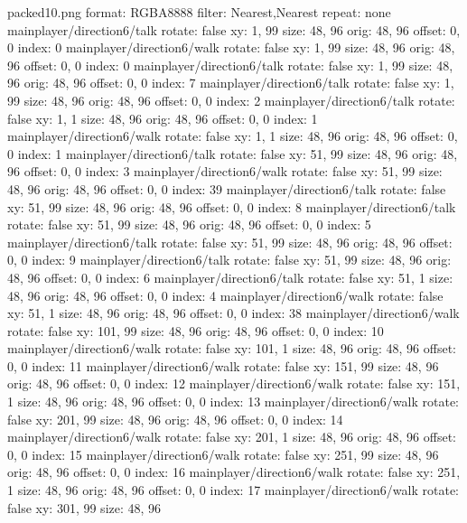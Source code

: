 packed10.png
format: RGBA8888
filter: Nearest,Nearest
repeat: none
mainplayer/direction6/talk
  rotate: false
  xy: 1, 99
  size: 48, 96
  orig: 48, 96
  offset: 0, 0
  index: 0
mainplayer/direction6/walk
  rotate: false
  xy: 1, 99
  size: 48, 96
  orig: 48, 96
  offset: 0, 0
  index: 0
mainplayer/direction6/talk
  rotate: false
  xy: 1, 99
  size: 48, 96
  orig: 48, 96
  offset: 0, 0
  index: 7
mainplayer/direction6/talk
  rotate: false
  xy: 1, 99
  size: 48, 96
  orig: 48, 96
  offset: 0, 0
  index: 2
mainplayer/direction6/talk
  rotate: false
  xy: 1, 1
  size: 48, 96
  orig: 48, 96
  offset: 0, 0
  index: 1
mainplayer/direction6/walk
  rotate: false
  xy: 1, 1
  size: 48, 96
  orig: 48, 96
  offset: 0, 0
  index: 1
mainplayer/direction6/talk
  rotate: false
  xy: 51, 99
  size: 48, 96
  orig: 48, 96
  offset: 0, 0
  index: 3
mainplayer/direction6/walk
  rotate: false
  xy: 51, 99
  size: 48, 96
  orig: 48, 96
  offset: 0, 0
  index: 39
mainplayer/direction6/talk
  rotate: false
  xy: 51, 99
  size: 48, 96
  orig: 48, 96
  offset: 0, 0
  index: 8
mainplayer/direction6/talk
  rotate: false
  xy: 51, 99
  size: 48, 96
  orig: 48, 96
  offset: 0, 0
  index: 5
mainplayer/direction6/talk
  rotate: false
  xy: 51, 99
  size: 48, 96
  orig: 48, 96
  offset: 0, 0
  index: 9
mainplayer/direction6/talk
  rotate: false
  xy: 51, 99
  size: 48, 96
  orig: 48, 96
  offset: 0, 0
  index: 6
mainplayer/direction6/talk
  rotate: false
  xy: 51, 1
  size: 48, 96
  orig: 48, 96
  offset: 0, 0
  index: 4
mainplayer/direction6/walk
  rotate: false
  xy: 51, 1
  size: 48, 96
  orig: 48, 96
  offset: 0, 0
  index: 38
mainplayer/direction6/walk
  rotate: false
  xy: 101, 99
  size: 48, 96
  orig: 48, 96
  offset: 0, 0
  index: 10
mainplayer/direction6/walk
  rotate: false
  xy: 101, 1
  size: 48, 96
  orig: 48, 96
  offset: 0, 0
  index: 11
mainplayer/direction6/walk
  rotate: false
  xy: 151, 99
  size: 48, 96
  orig: 48, 96
  offset: 0, 0
  index: 12
mainplayer/direction6/walk
  rotate: false
  xy: 151, 1
  size: 48, 96
  orig: 48, 96
  offset: 0, 0
  index: 13
mainplayer/direction6/walk
  rotate: false
  xy: 201, 99
  size: 48, 96
  orig: 48, 96
  offset: 0, 0
  index: 14
mainplayer/direction6/walk
  rotate: false
  xy: 201, 1
  size: 48, 96
  orig: 48, 96
  offset: 0, 0
  index: 15
mainplayer/direction6/walk
  rotate: false
  xy: 251, 99
  size: 48, 96
  orig: 48, 96
  offset: 0, 0
  index: 16
mainplayer/direction6/walk
  rotate: false
  xy: 251, 1
  size: 48, 96
  orig: 48, 96
  offset: 0, 0
  index: 17
mainplayer/direction6/walk
  rotate: false
  xy: 301, 99
  size: 48, 96
